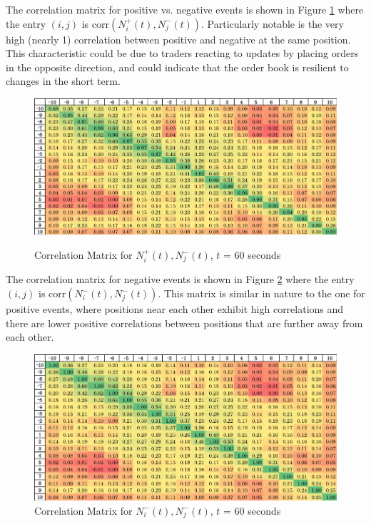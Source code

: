 The correlation matrix for positive vs. negative events is shown in Figure \ref{fig:pos_neg_corr_pic} where the entry $(i,j)$ is $\text{corr}(N^{+}_i(t), N^{-}_j(t))$. Particularly notable is the very high (nearly 1) correlation between positive and negative at the same position. This characteristic could be due to traders reacting to updates by placing orders in the opposite direction, and could indicate that the order book is resilient to changes in the short term.

\begin{figure}[t]
\caption{Correlation Matrix for $N^{+}_i(t), N^{-}_j(t)$, $t$ = 60 seconds}
\begin{center}
\label{fig:pos_neg_corr_pic}
\includegraphics[width=\textwidth]{LaTeX/Figures/pos_neg_correlations.png}
\end{center}
\end{figure}

The correlation matrix for negative events is shown in Figure \ref{fig:neg_neg_corr_pic} where the entry $(i,j)$ is $\text{corr}(N^{-}_i(t), N^{-}_j(t))$. This matrix is similar in nature to the one for positive events, where positions near each other exhibit high correlations and there are lower positive correlations between positions that are further away from each other.

\begin{figure}[t]
\begin{center}
\caption{Correlation Matrix for $N^{-}_i(t), N^{-}_j(t)$, $t$ = 60 seconds}
\label{fig:neg_neg_corr_pic}
\includegraphics[width=\textwidth]{LaTeX/Figures/neg_neg_correlations.png}
\end{center}
\end{figure}

